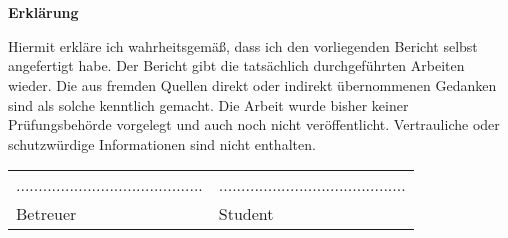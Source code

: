 \chapter*{}\label{ch:erklaerung}
\begin{center}
    \large \textbf{Erklärung}
\end{center}
Hiermit erkläre ich wahrheitsgemäß, dass ich den vorliegenden Bericht selbst angefertigt habe.
Der Bericht gibt die tatsächlich durchgeführten Arbeiten wieder.
Die aus fremden Quellen direkt oder indirekt übernommenen Gedanken sind als solche kenntlich gemacht.
Die Arbeit wurde bisher keiner Prüfungsbehörde vorgelegt und auch noch nicht veröffentlicht.
Vertrauliche oder schutzwürdige Informationen sind nicht enthalten.

\vspace{2\baselineskip}

\begin{tabular}{ll}
    .......................................... & .......................................... \\
    Betreuer                                   & Student
\end{tabular}
